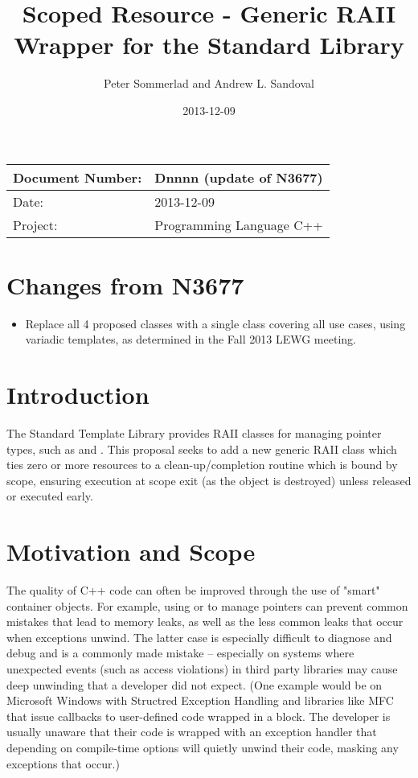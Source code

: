 \documentclass[ebook,11pt,article]{memoir}
\title{Scoped Resource - Generic RAII Wrapper for the Standard Library}
\author{Peter Sommerlad and Andrew L. Sandoval}
\date{2013-12-09}                                           %
\begin{document}
\maketitle
\begin{tabular}[t]{|l|l|}\hline 
Document Number: &  Dnnnn (update of N3677)\\\hline
Date: & 2013-12-09 \\\hline
Project: & Programming Language C++\\\hline 
\end{tabular}

\chapter{Changes from N3677}
\begin{itemize}
\item Replace all 4 proposed classes with a single class covering all use cases, using variadic templates, as determined in the Fall 2013 LEWG meeting.
\end{itemize}

\chapter{Introduction}
The Standard Template Library provides RAII classes for managing pointer types, such as  and .  This proposal seeks to add a new generic RAII class which ties zero or more resources to a clean-up/completion routine which is bound by scope, ensuring execution at scope exit (as the object is destroyed) unless released or executed early.

\chapter{Motivation and Scope}
The quality of C++ code can often be improved through the use of "smart" container objects.  For example, using  or  to manage pointers can prevent common mistakes that lead to memory leaks, as well as the less common leaks that occur when exceptions unwind.  The latter case is especially difficult to diagnose and debug and is a commonly made mistake -- especially on systems where unexpected events (such as access violations) in third party libraries may cause deep unwinding that a developer did not expect.  (One example would be on Microsoft Windows with Structred Exception Handling and libraries like MFC that issue callbacks to user-defined code wrapped in a  block.  The developer is usually unaware that their code is wrapped with an exception handler that depending on compile-time options will quietly unwind their code, masking any exceptions that occur.)
\end{document}
